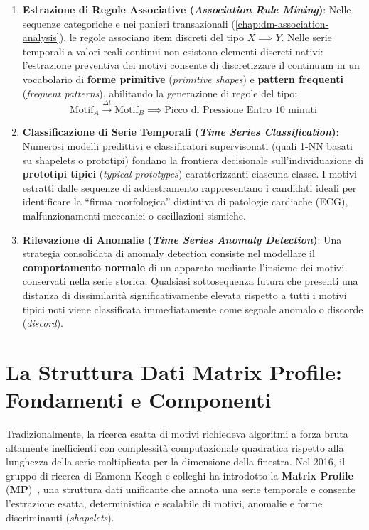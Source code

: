 \begin{enumerate}
    \item \textbf{Estrazione di Regole Associative (\textit{Association Rule Mining})}: 
    Nelle sequenze categoriche e nei panieri transazionali (\autoref{chap:dm-association-analysis}), le regole associano item discreti del tipo $X \implies Y$. Nelle serie temporali a valori reali continui non esistono elementi discreti nativi: l'estrazione preventiva dei motivi consente di discretizzare il continuum in un vocabolario di \textbf{forme primitive} (\textit{primitive shapes}) e \textbf{pattern frequenti} (\textit{frequent patterns}), abilitando la generazione di regole del tipo:
    \begin{equation}
    \text{Motif}_A \xrightarrow{\Delta t} \text{Motif}_B \implies \text{Picco di Pressione Entro } 10\text{ minuti}
    \end{equation}
    
    \item \textbf{Classificazione di Serie Temporali (\textit{Time Series Classification})}:
    Numerosi modelli predittivi e classificatori supervisonati (quali 1-NN basati su shapelets o prototipi) fondano la frontiera decisionale sull'individuazione di \textbf{prototipi tipici} (\textit{typical prototypes}) caratterizzanti ciascuna classe. I motivi estratti dalle sequenze di addestramento rappresentano i candidati ideali per identificare la ``firma morfologica'' distintiva di patologie cardiache (ECG), malfunzionamenti meccanici o oscillazioni sismiche.
    
    \item \textbf{Rilevazione di Anomalie (\textit{Time Series Anomaly Detection})}:
    Una strategia consolidata di anomaly detection consiste nel modellare il \textbf{comportamento normale} di un apparato mediante l'insieme dei motivi conservati nella serie storica. Qualsiasi sottosequenza futura che presenti una distanza di dissimilarit\`a significativamente elevata rispetto a tutti i motivi tipici noti viene classificata immediatamente come segnale anomalo o discorde (\textit{discord}).
\end{enumerate}

\FloatBarrier
\section{La Struttura Dati Matrix Profile: Fondamenti e Componenti}
\label{sec:ts-matrix-profile-foundations}

Tradizionalmente, la ricerca esatta di motivi richiedeva algoritmi a forza bruta altamente inefficienti con complessit\`a computazionale quadratica rispetto alla lunghezza della serie moltiplicata per la dimensione della finestra. Nel 2016, il gruppo di ricerca di Eamonn Keogh e colleghi ha introdotto la \textbf{Matrix Profile} (\textbf{MP})~\cite{yeh2016}, una struttura dati unificante che annota una serie temporale e consente l'estrazione esatta, deterministica e scalabile di motivi, anomalie e forme discriminanti (\textit{shapelets}).

